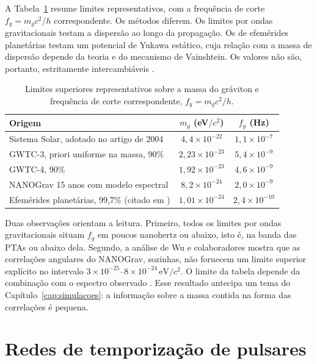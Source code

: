 A Tabela~\ref{tab:fund-limites} resume limites representativos, com a
frequência de corte $f_g=m_gc^2/h$ correspondente. Os métodos diferem.
Os limites por ondas gravitacionais testam a dispersão ao longo da
propagação. Os de efemérides planetárias testam um potencial de Yukawa
estático, cuja relação com a massa de dispersão depende da teoria e do
mecanismo de Vainshtein. Os valores não são, portanto, estritamente
intercambiáveis \autocite{will2014,lvk2026}.

\begin{table}[htbp]
\centering
\caption{Limites superiores representativos sobre a massa do gráviton e
frequência de corte correspondente, $f_g=m_gc^2/h$.}
\label{tab:fund-limites}
\small
\begin{tabular}{p{}cc}
\toprule
Origem & $m_g$ (eV$/c^2$) & $f_g$ (Hz)\\
\midrule
Sistema Solar, adotado no artigo de 2004 \autocite{depaula2004} & $4{,}4\times10^{-22}$ & $1{,}1\times10^{-7}$\\
GWTC-3, priori uniforme na massa, 90\% \autocite{lvk2026} & $2{,}23\times10^{-23}$ & $5{,}4\times10^{-9}$\\
GWTC-4, 90\% \autocite{lvk2026} & $1{,}92\times10^{-23}$ & $4{,}6\times10^{-9}$\\
NANOGrav 15 anos com modelo espectral \autocite{wu2024} & $8{,}2\times10^{-24}$ & $2{,}0\times10^{-9}$\\
Efemérides planetárias, 99,7\% (citado em \autocite{lvk2026}) & $1{,}01\times10^{-24}$ & $2{,}4\times10^{-10}$\\
\bottomrule
\end{tabular}
\end{table}

Duas observações orientam a leitura. Primeiro, todos os limites por
ondas gravitacionais situam $f_g$ em poucos nanohertz ou abaixo, isto é,
na banda das PTAs ou abaixo dela. Segundo, a análise de Wu e
colaboradores mostra que as correlações angulares do NANOGrav, sozinhas,
não fornecem um limite superior explícito no intervalo
$3\times10^{-25}$--$8\times10^{-24}\,\mathrm{eV}/c^2$. O limite da
tabela depende da combinação com o espectro observado \autocite{wu2024}.
Esse resultado antecipa um tema do Capítulo~\ref{cap:simulacoes}: a
informação sobre a massa contida na forma das correlações é pequena.

\section{Redes de temporização de pulsares}

